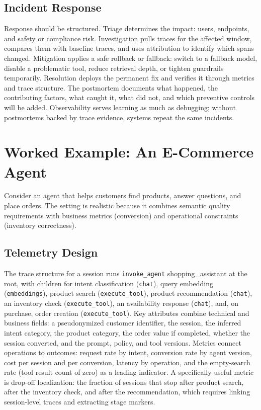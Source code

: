 \documentclass[11pt]{book}
\begin{document}
\subsection{Incident Response}

Response should be structured. Triage determines the impact: users, endpoints, and safety or compliance risk. Investigation pulls traces for the affected window, compares them with baseline traces, and uses attribution to identify which spans changed. Mitigation applies a safe rollback or fallback: switch to a fallback model, disable a problematic tool, reduce retrieval depth, or tighten guardrails temporarily. Resolution deploys the permanent fix and verifies it through metrics and trace structure. The postmortem documents what happened, the contributing factors, what caught it, what did not, and which preventive controls will be added. Observability serves learning as much as debugging; without postmortems backed by trace evidence, systems repeat the same incidents.

\section{Worked Example: An E-Commerce Agent}

Consider an agent that helps customers find products, answer questions, and place orders. The setting is realistic because it combines semantic quality requirements with business metrics (conversion) and operational constraints (inventory correctness).

\subsection{Telemetry Design}

The trace structure for a session runs \texttt{invoke\_agent} shopping\_assistant at the root, with children for intent classification (\texttt{chat}), query embedding (\texttt{embeddings}), product search (\texttt{execute\_tool}), product recommendation (\texttt{chat}), an inventory check (\texttt{execute\_tool}), an availability response (\texttt{chat}), and, on purchase, order creation (\texttt{execute\_tool}). Key attributes combine technical and business fields: a pseudonymized customer identifier, the session, the inferred intent category, the product category, the order value if completed, whether the session converted, and the prompt, policy, and tool versions. Metrics connect operations to outcomes: request rate by intent, conversion rate by agent version, cost per session and per conversion, latency by operation, and the empty-search rate (tool result count of zero) as a leading indicator. A specifically useful metric is drop-off localization: the fraction of sessions that stop after product search, after the inventory check, and after the recommendation, which requires linking session-level traces and extracting stage markers.
\end{document}
